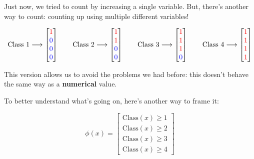                 Just now, we tried to count by increasing a single variable. But, there's another way to count: counting up using multiple different variables!

                \begin{equation*}
                    \text{Class 1} \longrightarrow
                    \begin{bmatrix}
                    \textcolor{red}{1} \\ \textcolor{blue}{0} \\ \textcolor{blue}{0} \\ \textcolor{blue}{0}
                    \end{bmatrix}
                    \qquad 
                    \text{Class 2} \longrightarrow
                    \begin{bmatrix}
                    \textcolor{red}{1} \\ \textcolor{red}{1} \\ \textcolor{blue}{0} \\ \textcolor{blue}{0}
                    \end{bmatrix}
                    \qquad 
                    \text{Class 3} \longrightarrow
                    \begin{bmatrix}
                    \textcolor{red}{1} \\ \textcolor{red}{1} \\ \textcolor{red}{1} \\ \textcolor{blue}{0}
                    \end{bmatrix}
                    \qquad 
                    \text{Class 4} \longrightarrow
                    \begin{bmatrix}
                    \textcolor{red}{1} \\ \textcolor{red}{1} \\ \textcolor{red}{1} \\ \textcolor{red}{1}
                    \end{bmatrix}
                    \end{equation*}
                
                This version allows us to avoid the problems we had before: this doesn't behave the same way as a \textbf{numerical} value.

                To better understand what's going on, here's another way to frame it:

                \begin{equation}
                    \phi(x) =
                    \begin{bmatrix}
                    \text{Class}(x)\geq 1 \\
                    \text{Class}(x)\geq 2 \\
                    \text{Class}(x)\geq 3 \\
                    \text{Class}(x)\geq 4
                    \end{bmatrix}
                \end{equation}

